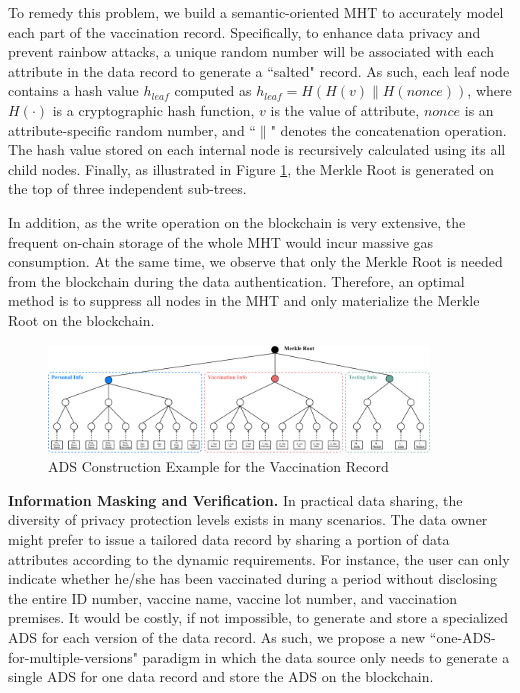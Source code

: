 \documentclass[11pt,divpdfm]{article}
\begin{document}
To remedy this problem, we build a semantic-oriented MHT to accurately model each part of the vaccination record.
Specifically, to enhance data privacy and prevent rainbow attacks, a unique random number will be
associated with each attribute in the data record to generate a ``salted" record.
As such, each leaf node contains a hash value $h_{leaf}$ computed as
$h_{leaf} = H(H(v) \| H(nonce))$,
where $H(\cdot)$ is a cryptographic hash function, $v$ is the value of attribute, $nonce$ is an attribute-specific random number, and ``$\|$" denotes the concatenation operation.
The hash value stored on each internal node is recursively calculated using its all child nodes.
Finally, as illustrated in Figure \ref{fig:ADS}, the Merkle Root is generated on the top of three independent sub-trees.

In addition, as the write operation on the blockchain is very extensive, the frequent on-chain storage of the whole MHT would incur massive gas consumption.
At the same time, we observe that only the Merkle Root is needed from the blockchain during the data authentication.
Therefore, an optimal method is to suppress all nodes in the MHT and only materialize the Merkle Root on the blockchain.



\begin{figure}[t]
	\centering
	\includegraphics[width=0.9\textwidth]{figs/Fig_ADS.pdf}
	\caption{ADS Construction Example for the Vaccination Record}
	\label{fig:ADS}
\end{figure}

\textbf{Information Masking and Verification.}
In practical data sharing, the diversity of privacy protection levels exists in many scenarios.
The data owner might prefer to issue a tailored data record by sharing a portion of data attributes according to the dynamic requirements.
For instance, the user can only indicate whether he/she has been vaccinated during a period without disclosing the entire ID number, vaccine name, vaccine lot number, and vaccination premises.
It would be costly, if not impossible, to generate and store a specialized ADS for each version of the data record.
As such, we propose a new ``one-ADS-for-multiple-versions" paradigm in which the data source only needs to generate a single ADS for one data record and store the ADS on the blockchain.
\end{document}
